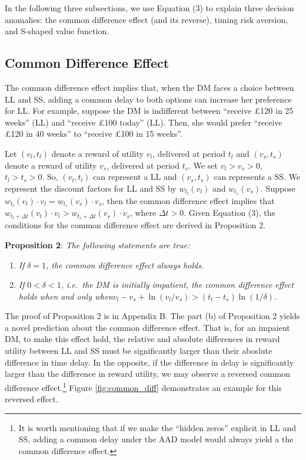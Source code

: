 \documentclass[
  12pt,
]{article}
\begin{document}
In the following three subsections, we use Equation (3) to explain three
decision anomalies: the common difference effect (and its reverse),
timing risk aversion, and S-shaped value function.

\hypertarget{common-difference-effect}{%
\subsection{Common Difference Effect}\label{common-difference-effect}}

The common difference effect \citep{loewenstein1992anomalies} implies
that, when the DM faces a choice between LL and SS, adding a common
delay to both options can increase her preference for LL. For example,
suppose the DM is indifferent between ``receive £120 in 25 weeks'' (LL)
and ``receive £100 today'' (LL). Then, she would prefer ``receive £120
in 40 weeks'' to ``receive £100 in 15 weeks''.

Let \((v_l,t_l)\) denote a reward of utility \(v_l\), delivered at
period \(t_l\) and \((v_s,t_s)\) denote a reward of utility \(v_s\),
delivered at period \(t_s\). We set \(v_l>v_s>0\), \(t_l>t_s>0\). So,
\((v_l,t_l)\) can represent a LL and \((v_s,t_s)\) can represents a SS.
We represent the discount factors for LL and SS by \(w_{t_l}(v_l)\) and
\(w_{t_s}(v_s)\). Suppose
\(w_{t_l}(v_l)\cdot v_l = w_{t_s}(v_s)\cdot v_s\), then the common
difference effect implies that
\(w_{t_l+\Delta t}(v_l)\cdot v_l > w_{t_s+\Delta t}(v_s)\cdot v_s\),
where \(\Delta t >0\). Given Equation (3), the conditions for the common
difference effect are derived in Proposition 2.

\noindent \textbf{Proposition 2}: \emph{The following statements are
true:}

\begin{enumerate}
\def\labelenumi{(\alph{enumi})}
\item
  \emph{If} \(\delta=1\)\emph{, the common difference effect always
  holds.}
\item
  \emph{If} \(0<\delta<1\)\emph{, i.e.~the DM is initially impatient,
  the common difference effect holds when and only
  when}\(v_l-v_s+\ln(v_l/v_s)>(t_l-t_s)\ln(1/\delta)\)\emph{.}
\end{enumerate}

The proof of Proposition 2 is in Appendix B. The part (b) of Proposition
2 yields a novel prediction about the common difference effect. That is,
for an impaient DM, to make this effect hold, the relative and absolute
differences in reward utility between LL and SS must be significantly
larger than their aboslute difference in time delay. In the opposite, if
the difference in delay is significantly larger than the difference in
reward utility, we may observe a reversed common difference
effect.\footnote{It is worth mentioning that if we make the ``hidden
  zeros'' explicit in LL and SS, adding a common delay under the AAD
  model would always yield a the common difference effect.} Figure
\ref{fig:common_diff} demonstrates an example for this reversed effect.
\end{document}
